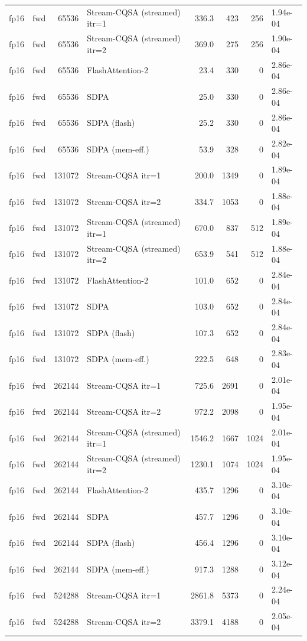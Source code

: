 \begin{tabular}{llrlrrrl}
fp16 & fwd & 65536 & Stream-CQSA (streamed) itr=1 & 336.3 & 423 & 256 & 1.94e-04 \\
fp16 & fwd & 65536 & Stream-CQSA (streamed) itr=2 & 369.0 & 275 & 256 & 1.90e-04 \\
fp16 & fwd & 65536 & FlashAttention-2 & 23.4 & 330 & 0 & 2.86e-04 \\
fp16 & fwd & 65536 & SDPA & 25.0 & 330 & 0 & 2.86e-04 \\
fp16 & fwd & 65536 & SDPA (flash) & 25.2 & 330 & 0 & 2.86e-04 \\
fp16 & fwd & 65536 & SDPA (mem-eff.) & 53.9 & 328 & 0 & 2.82e-04 \\
fp16 & fwd & 131072 & Stream-CQSA itr=1 & 200.0 & 1349 & 0 & 1.89e-04 \\
fp16 & fwd & 131072 & Stream-CQSA itr=2 & 334.7 & 1053 & 0 & 1.88e-04 \\
fp16 & fwd & 131072 & Stream-CQSA (streamed) itr=1 & 670.0 & 837 & 512 & 1.89e-04 \\
fp16 & fwd & 131072 & Stream-CQSA (streamed) itr=2 & 653.9 & 541 & 512 & 1.88e-04 \\
fp16 & fwd & 131072 & FlashAttention-2 & 101.0 & 652 & 0 & 2.84e-04 \\
fp16 & fwd & 131072 & SDPA & 103.0 & 652 & 0 & 2.84e-04 \\
fp16 & fwd & 131072 & SDPA (flash) & 107.3 & 652 & 0 & 2.84e-04 \\
fp16 & fwd & 131072 & SDPA (mem-eff.) & 222.5 & 648 & 0 & 2.83e-04 \\
fp16 & fwd & 262144 & Stream-CQSA itr=1 & 725.6 & 2691 & 0 & 2.01e-04 \\
fp16 & fwd & 262144 & Stream-CQSA itr=2 & 972.2 & 2098 & 0 & 1.95e-04 \\
fp16 & fwd & 262144 & Stream-CQSA (streamed) itr=1 & 1546.2 & 1667 & 1024 & 2.01e-04 \\
fp16 & fwd & 262144 & Stream-CQSA (streamed) itr=2 & 1230.1 & 1074 & 1024 & 1.95e-04 \\
fp16 & fwd & 262144 & FlashAttention-2 & 435.7 & 1296 & 0 & 3.10e-04 \\
fp16 & fwd & 262144 & SDPA & 457.7 & 1296 & 0 & 3.10e-04 \\
fp16 & fwd & 262144 & SDPA (flash) & 456.4 & 1296 & 0 & 3.10e-04 \\
fp16 & fwd & 262144 & SDPA (mem-eff.) & 917.3 & 1288 & 0 & 3.12e-04 \\
fp16 & fwd & 524288 & Stream-CQSA itr=1 & 2861.8 & 5373 & 0 & 2.24e-04 \\
fp16 & fwd & 524288 & Stream-CQSA itr=2 & 3379.1 & 4188 & 0 & 2.05e-04 \\

\end{tabular}
